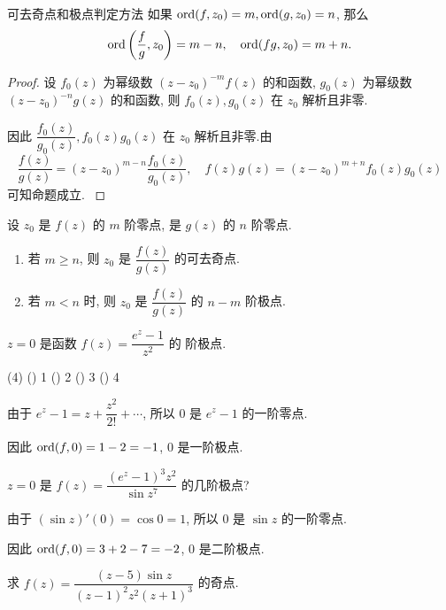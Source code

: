 \begin{theorem}{可去奇点和极点判定方法}
	如果 ${\mathrm{ord}}(f,z_0)=m,{\mathrm{ord}}(g,z_0)=n$, 那么
	\[{\mathrm{ord}}\left(\frac fg,z_0\right)=m-n,\quad{\mathrm{ord}}(fg,z_0)=m+n.\]
\end{theorem}

\begin{proof}
		设 $f_0(z)$ 为幂级数 $(z-z_0)^{-m}f(z)$ 的和函数, $g_0(z)$ 为幂级数 $(z-z_0)^{-n}g(z)$ 的和函数,
	{则 $f_0(z),g_0(z)$ 在 $z_0$ 解析且非零.
	}%

	{因此 $\dfrac{f_0(z)}{g_0(z)},f_0(z)g_0(z)$ 在 $z_0$ 解析且非零.由
		\[\frac{f(z)}{g(z)}=(z-z_0)^{m-n}\frac{f_0(z)}{g_0(z)},\quad
		f(z)g(z)=(z-z_0)^{m+n}f_0(z)g_0(z)\]
		可知命题成立.\qedhere
	}
\end{proof}

\begin{corollary}
	设 $z_0$ 是 $f(z)$ 的 $m$ 阶零点, 是 $g(z)$ 的 $n$ 阶零点.
	\begin{enumerate}
		\item 若 $m\ge n$, 则 $z_0$ 是 $\dfrac{f(z)}{g(z)}$ 的可去奇点.
		\item 若 $m<n$ 时, 则 $z_0$ 是 $\dfrac{f(z)}{g(z)}$ 的 $n-m$ 阶极点.
	\end{enumerate}
\end{corollary}

\begin{example}
	$z=0$ 是函数 $f(z)=\dfrac{e^z-1}{z^2}$ 的 阶极点.
	\begin{taskschoice}(4)
		() 1
		() 2
		() 3
		() 4
	\end{taskschoice}
\end{example}

\begin{solution}
		由于 $e^z-1=z+\dfrac{z^2}{2!}+\cdots$, 所以 $0$ 是 $e^z-1$ 的一阶零点.

	{因此 ${\mathrm{ord}}(f,0)=1-2=-1$, $0$ 是一阶极点.
	}
\end{solution}

\begin{example}
	$z=0$ 是 $f(z)=\dfrac{(e^z-1)^3z^2}{\sin z^7}$ 的几阶极点?
\end{example}

\begin{solution}
		由于 $(\sin z)'(0)=\cos 0=1$, 所以 $0$ 是 $\sin z$ 的一阶零点.

	{因此 ${\mathrm{ord}}(f,0)=3+2-7=-2$, $0$ 是二阶极点.
	}
\end{solution}

\begin{exercise}
	求 $f(z)=\dfrac{(z-5)\sin z}{(z-1)^2z^2(z+1)^3}$ 的奇点.
\end{exercise}

